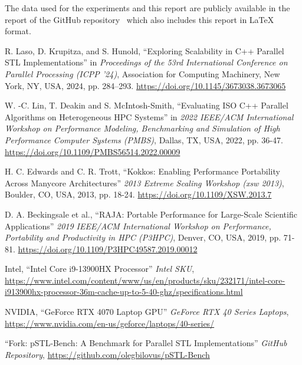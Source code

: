 \documentclass[sigconf]{acmart}
\begin{document}
The data used for the experiments and this report are publicly available in the
report of the GitHub repository~\cite{pSTL-Bench-report:github} which also
includes this report in LaTeX format.

\balance{}

\begin{thebibliography}{1}

      R. Laso, D. Krupitza, and S. Hunold, ``Exploring Scalability in C++ Parallel STL Implementations'' in \textit{Proceedings of the 53rd International Conference on Parallel Processing (ICPP '24)},
      Association for Computing Machinery, New York, NY, USA, 2024, pp. 284--293.
      \url{https://doi.org/10.1145/3673038.3673065}

      W. -C. Lin, T. Deakin and S. McIntosh-Smith, ``Evaluating ISO C++ Parallel Algorithms on Heterogeneous HPC Systems'' in  \textit{2022 IEEE/ACM International Workshop on Performance Modeling, Benchmarking and Simulation of High Performance Computer Systems (PMBS)},
      Dallas, TX, USA, 2022, pp. 36-47.
      \url{https://doi.org/10.1109/PMBS56514.2022.00009}

      H. C. Edwards and C. R. Trott, ``Kokkos: Enabling Performance Portability Across Manycore Architectures'' \textit{2013 Extreme Scaling Workshop (xsw 2013)},
      Boulder, CO, USA, 2013, pp. 18-24.
      \url{https://doi.org/10.1109/XSW.2013.7}

      D. A. Beckingsale et al., ``RAJA: Portable Performance for Large-Scale Scientific Applications'' \textit{2019 IEEE/ACM International Workshop on Performance, Portability and Productivity in HPC (P3HPC)},
      Denver, CO, USA, 2019, pp. 71-81.
      \url{https://doi.org/10.1109/P3HPC49587.2019.00012}

      Intel, ``Intel Core i9-13900HX Processor'' \textit{Intel SKU},
      \url{https://www.intel.com/content/www/us/en/products/sku/232171/intel-core-i913900hx-processor-36m-cache-up-to-5-40-ghz/specifications.html}

      NVIDIA, ``GeForce RTX 4070 Laptop GPU'' \textit{GeForce RTX 40 Series Laptops},
      \url{https://www.nvidia.com/en-us/geforce/laptops/40-series/}

      ``Fork: pSTL-Bench: A Benchmark for Parallel STL Implementations'' \textit{GitHub Repository},
      \url{https://github.com/olegbilovus/pSTL-Bench}


\end{thebibliography}
\end{document}
